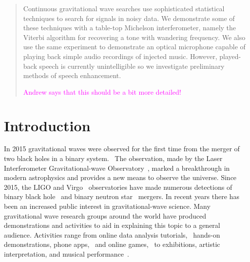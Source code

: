 \documentclass[prb,preprint]{revtex4-1}
\newcommand{\jam}{\textcolor{magenta}}
\begin{document}
\date{\today}

\begin{abstract}
Continuous gravitational wave searches use sophisticated statistical techniques to search for signals in noisy data. We demonstrate some of these techniques with a table-top Michelson interferometer, namely the Viterbi algorithm for recovering a tone with wandering frequency.
We also use the same experiment to demonstrate an optical microphone capable of playing back simple audio recordings of injected music. However, played-back speech is currently unintelligible so we investigate preliminary methods of speech enhancement.
 
\jam{Andrew says that this should be a bit more detailed!}

\end{abstract}

\maketitle

\section{Introduction}
\label{sec:introduction}

In 2015 gravitational waves were observed for the first time from the merger of two black holes in a binary system.~\cite{GW150914} 
The observation, made by the Laser Interferometer Gravitational-wave Observatory~\citep[LIGO]{AdvancedLIGO:2015}, marked a breakthrough in modern astrophysics and provides a new means to observe the universe. 
Since 2015, the LIGO and Virgo~\cite{AdvancedVirgo:2015} observatories have made numerous detections of binary black hole~\cite{GW151226,GW170104,GW170814} and binary neutron star~\cite{GW170817,GW170817multi,GW190425} mergers. 
In recent years there has been an increased public interest in gravitational-wave science. 
Many gravitational wave research groups around the world have produced demonstrations and activities to aid in explaining this topic to a general audience.
Activities range from online data analysis tutorials,~\cite{GWOSC:online,LOSC:2015} hands-on demonstrations, phone apps,~\cite{LaserLabs:online,SciVR:online} and online games,~\cite{BlackHoleHunter:online} to exhibitions,\cite{L2URSSE} artistic interpretation, and musical performance~\cite{ArthurJeffesMusic:online,GravitySynthLeonTrimble:online}. 
\end{document}

